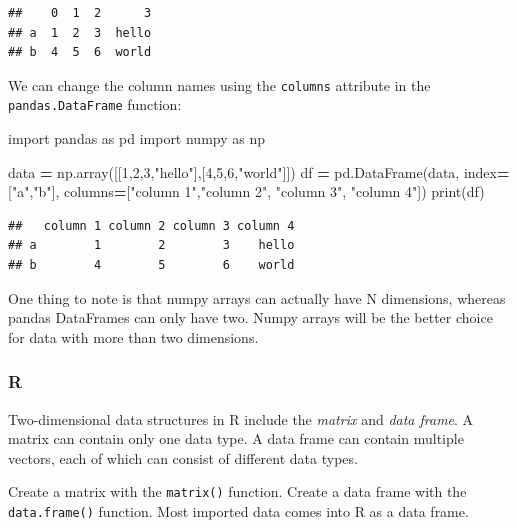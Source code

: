 \documentclass[
]{book}
\newenvironment{Shaded}{\begin{snugshade}}{\end{snugshade}}
\newcommand{\BuiltInTok}[1]{#1}
\newcommand{\DecValTok}[1]{\textcolor[rgb]{0.00,0.00,0.81}{#1}}
\newcommand{\ImportTok}[1]{#1}
\newcommand{\NormalTok}[1]{#1}
\newcommand{\OperatorTok}[1]{\textcolor[rgb]{0.81,0.36,0.00}{\textbf{#1}}}
\newcommand{\StringTok}[1]{\textcolor[rgb]{0.31,0.60,0.02}{#1}}
\begin{document}
\begin{verbatim}
##    0  1  2      3
## a  1  2  3  hello
## b  4  5  6  world
\end{verbatim}

We can change the column names using the \texttt{columns} attribute in the \texttt{pandas.DataFrame} function:

\begin{Shaded}
\begin{Highlighting}[]
\ImportTok{import}\NormalTok{ pandas }\ImportTok{as}\NormalTok{ pd}
\ImportTok{import}\NormalTok{ numpy }\ImportTok{as}\NormalTok{ np}

\NormalTok{data }\OperatorTok{=}\NormalTok{ np.array([[}\DecValTok{1}\NormalTok{,}\DecValTok{2}\NormalTok{,}\DecValTok{3}\NormalTok{,}\StringTok{"hello"}\NormalTok{],[}\DecValTok{4}\NormalTok{,}\DecValTok{5}\NormalTok{,}\DecValTok{6}\NormalTok{,}\StringTok{"world"}\NormalTok{]])}
\NormalTok{df }\OperatorTok{=}\NormalTok{ pd.DataFrame(data, index}\OperatorTok{=}\NormalTok{[}\StringTok{"a"}\NormalTok{,}\StringTok{"b"}\NormalTok{], columns}\OperatorTok{=}\NormalTok{[}\StringTok{"column 1"}\NormalTok{,}\StringTok{"column 2"}\NormalTok{, }\StringTok{"column 3"}\NormalTok{, }\StringTok{"column 4"}\NormalTok{])}
\BuiltInTok{print}\NormalTok{(df)}
\end{Highlighting}
\end{Shaded}

\begin{verbatim}
##   column 1 column 2 column 3 column 4
## a        1        2        3    hello
## b        4        5        6    world
\end{verbatim}

One thing to note is that numpy arrays can actually have N dimensions, whereas pandas DataFrames can only have two. Numpy arrays will be the better choice for data with more than two dimensions.

\hypertarget{r-9}{%
\subsubsection*{R}\label{r-9}}

Two-dimensional data structures in R include the \emph{matrix} and \emph{data frame}. A matrix can contain only one data type. A data frame can contain multiple vectors, each of which can consist of different data types.

Create a matrix with the \texttt{matrix()} function. Create a data frame with the \texttt{data.frame()} function. Most imported data comes into R as a data frame.
\end{document}
